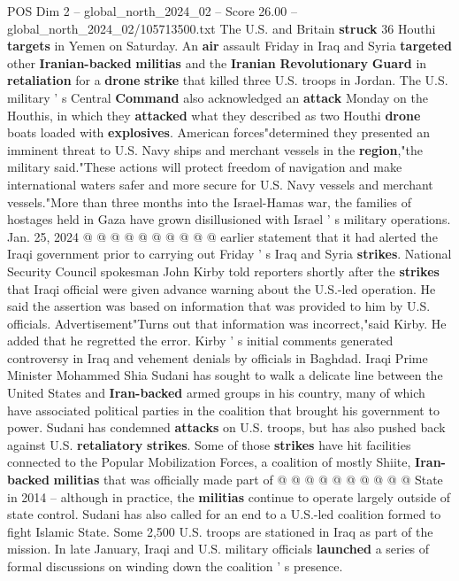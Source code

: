 \begin{textsample}{POS Dim 2 – global\_north\_2024\_02 – Score 26.00 – global\_north\_2024\_02/105713500.txt}
The U.S. and Britain \textbf{struck} 36 Houthi \textbf{targets} in Yemen on Saturday.
An \textbf{air} assault Friday in Iraq and Syria \textbf{targeted} other \textbf{Iranian-backed} \textbf{militias} and the \textbf{Iranian} \textbf{Revolutionary} \textbf{Guard} in \textbf{retaliation} for a \textbf{drone} \textbf{strike} that killed three U.S. troops in Jordan.
The U.S. military ' s Central \textbf{Command} also acknowledged an \textbf{attack} Monday on the Houthis, in which they \textbf{attacked} what they described as two Houthi \textbf{drone} boats loaded with \textbf{explosives}.
American forces"determined they presented an imminent threat to U.S.
Navy ships and merchant vessels in the \textbf{region},"the military said."These actions will protect freedom of navigation and make international waters safer and more secure for U.S.
Navy vessels and merchant vessels."More than three months into the Israel-Hamas war, the families of hostages held in Gaza have grown disillusioned with Israel ' s military operations.
Jan. 25, 2024 @ @ @ @ @ @ @ @ @ @ earlier statement that it had alerted the Iraqi government prior to carrying out Friday ' s Iraq and Syria \textbf{strikes}.
National Security Council spokesman John Kirby told reporters shortly after the \textbf{strikes} that Iraqi official were given advance warning about the U.S.-led operation.
He said the assertion was based on information that was provided to him by U.S. officials.
Advertisement"Turns out that information was incorrect,"said Kirby.
He added that he regretted the error.
Kirby ' s initial comments generated controversy in Iraq and vehement denials by officials in Baghdad.
Iraqi Prime Minister Mohammed Shia Sudani has sought to walk a delicate line between the United States and \textbf{Iran-backed} armed groups in his country, many of which have associated political parties in the coalition that brought his government to power.
Sudani has condemned \textbf{attacks} on U.S. troops, but has also pushed back against U.S. \textbf{retaliatory} \textbf{strikes}.
Some of those \textbf{strikes} have hit facilities connected to the Popular Mobilization Forces, a coalition of mostly Shiite, \textbf{Iran-backed} \textbf{militias} that was officially made part of @ @ @ @ @ @ @ @ @ @ State in 2014 -- although in practice, the \textbf{militias} continue to operate largely outside of state control.
Sudani has also called for an end to a U.S.-led coalition formed to fight Islamic State.
Some 2,500 U.S. troops are stationed in Iraq as part of the mission.
In late January, Iraqi and U.S. military officials \textbf{launched} a series of formal discussions on winding down the coalition ' s presence.

\end{textsample}
